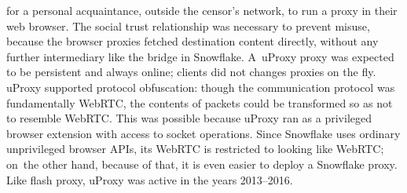 \documentclass[letterpaper,twocolumn]{article}
\begin{document}
for a personal acquaintance, outside the censor's network,
to run a proxy in their web browser.
The social trust relationship was necessary to prevent misuse,
because the browser proxies fetched destination content directly,
without any further intermediary like the bridge in Snowflake.
A~uProxy proxy was expected to be
persistent and always online;
clients did not changes proxies on the fly.
uProxy supported protocol obfuscation:
though the communication protocol was fundamentally WebRTC,
the contents of packets could be transformed so as not to resemble WebRTC.
This was possible because uProxy ran as a privileged browser extension
with access to socket operations.
Since Snowflake uses ordinary unprivileged browser APIs,
its WebRTC is restricted to looking like WebRTC;
on~the other hand, because of that,
it is even easier to deploy a Snowflake proxy.
Like flash proxy, uProxy was active in the years
2013--2016.
\end{document}

